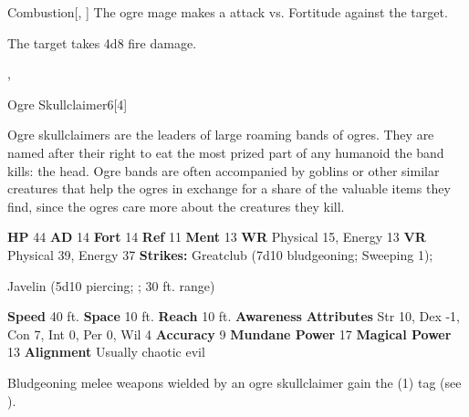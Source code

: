     \begin{freeability}{Combustion}[, ]
       The ogre mage makes a  attack
        vs. Fortitude against the target.
    
    \hit The target takes 4d8 fire damage.
    \end{freeability}
  ,
  \begin{monsubsection}{Ogre Skullclaimer}{6}[4]
    \vspace{-1em}\vspace{-1em}
    \vspace{0em}

    
        Ogre skullclaimers are the leaders of large roaming bands of ogres.
        They are named after their right to eat the most prized part of any humanoid the band kills: the head.
        Ogre bands are often accompanied by goblins or other similar creatures that help the ogres in exchange for a share of the valuable items they find, since the ogres care more about the creatures they kill.
      
    

    \begin{spellcontent}
      \begin{spelltargetinginfo}
        \pari \textbf{HP} 44 \monsep
          \textbf{AD} 14 \monsep
          \textbf{Fort} 14 \monsep
          \textbf{Ref} 11 \monsep
          \textbf{Ment} 13
        \pari \textbf{WR} Physical 15, Energy 13 \monsep
        \textbf{VR} Physical 39, Energy 37
        \pari \textbf{Strikes:}
            Greatclub  (7d10 bludgeoning; Sweeping 1);
\par Javelin  (5d10 piercing; ; 30 ft. range)
      \end{spelltargetinginfo}
    \end{spellcontent}
    \begin{monsterfooter}
      \pari \textbf{Speed} 40 ft. \monsep
        \textbf{Space} 10 ft. \monsep
        \textbf{Reach} 10 ft.
      \pari \textbf{Awareness} 
      \pari \textbf{Attributes}
        Str 10, Dex -1,
        Con 7, Int 0,
        Per 0, Wil 4
      \pari \textbf{Accuracy} 9 \monsep
        \textbf{Mundane Power} 17 \monsep
      \textbf{Magical Power} 13
      \pari \textbf{Alignment} Usually chaotic evil
    \end{monsterfooter}
  \end{monsubsection}
            Bludgeoning melee weapons wielded by an ogre skullclaimer gain the  (1) tag (see ).
  

